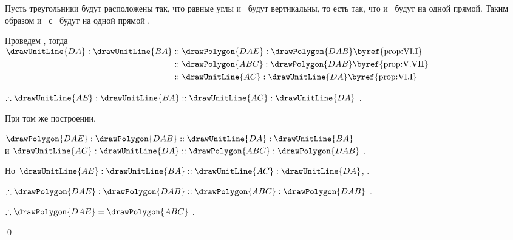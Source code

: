 \documentclass[letters,booklanguage=russian]{byrnebook}
\begin{document}
Пусть треугольники будут расположены так, что равные углы  и~ будут вертикальны, то есть так, что  и~ будут на одной прямой. Таким образом и~ с~ будут на одной прямой .

\begin{center}
Проведем , тогда\\
$\begin{aligned}
	\drawUnitLine{DA} : \drawUnitLine{BA}
	&:: \drawPolygon{DAE} : \drawPolygon{DAB} \mbox{\byref{prop:VI.I}}\\
	&:: \drawPolygon{ABC} : \drawPolygon{DAB} \mbox{\byref{prop:V.VII}}\\
	&:: \drawUnitLine{AC} : \drawUnitLine{DA} \mbox{\byref{prop:VI.I}}\\
\end{aligned}$

$\therefore \drawUnitLine{AE} : \drawUnitLine{BA} :: \drawUnitLine{AC} : \drawUnitLine{DA}$ .
\end{center}

\vfill\pagebreak

\begin{center}
При том же построении.

$\drawPolygon{DAE} : \drawPolygon{DAB} :: \drawUnitLine{DA} : \drawUnitLine{BA}$ \\
и $\drawUnitLine{AC} : \drawUnitLine{DA} :: \drawPolygon{ABC} : \drawPolygon{DAB}$ .

Но $ \drawUnitLine{AE} : \drawUnitLine{BA} :: \drawUnitLine{AC} : \drawUnitLine{DA}$, \byref{\hypref}.

$\therefore \drawPolygon{DAE} : \drawPolygon{DAB} :: \drawPolygon{ABC} : \drawPolygon{DAB}$ .

$\therefore \drawPolygon{DAE} = \drawPolygon{ABC}$ .
\end{center}

\qed
\end{document}
